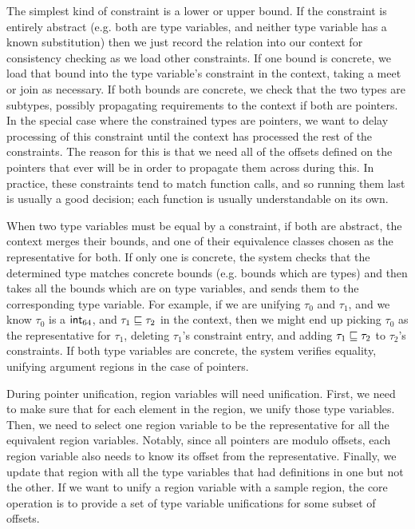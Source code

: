 The simplest kind of constraint is a lower or upper bound. If the constraint is entirely abstract (e.g. both are type variables, and neither type variable has a known substitution) then we just record the relation into our context for consistency checking as we load other constraints. If one bound is concrete, we load that bound into the type variable's constraint in the context, taking a meet or join as necessary. If both bounds are concrete, we check that the two types are subtypes, possibly propagating requirements to the context if both are pointers.
In the special case where the constrained types are pointers, we want to delay processing of this constraint until the context has processed the rest of the constraints.
The reason for this is that we need all of the offsets defined on the pointers that ever will be in order to propagate them across during this. In practice, these constraints tend to match function calls, and so running them last is usually a good decision; each function is usually understandable on its own.

When two type variables must be equal by a constraint, if both are abstract, the context merges their bounds, and one of their equivalence classes chosen as the representative for both. If only one is concrete, the system checks that the determined type matches concrete bounds (e.g. bounds which are types) and then takes all the bounds which are on type variables, and sends them to the corresponding type variable. For example, if we are unifying $\tau_0$ and $\tau_1$, and we know $\tau_0$ is a $\mathsf{int}_{64}$, and $\tau_1 \sqsubseteq \tau_2$ in the context, then we might end up picking $\tau_0$ as the representative for $\tau_1$, deleting $\tau_1$'s constraint entry, and adding $\tau_1 \sqsubseteq \tau_2$ to $\tau_2$'s constraints. If both type variables are concrete, the system verifies equality, unifying argument regions in the case of pointers.

During pointer unification, region variables will need unification. First, we need to make sure that for each element in the region, we unify those type variables. Then, we need to select one region variable to be the representative for all the equivalent region variables. Notably, since all pointers are modulo offsets, each region variable also needs to know its offset from the representative. Finally, we update that region with all the type variables that had definitions in one but not the other. If we want to unify a region variable with a sample region, the core operation is to provide a set of type variable unifications for some subset of offsets.

